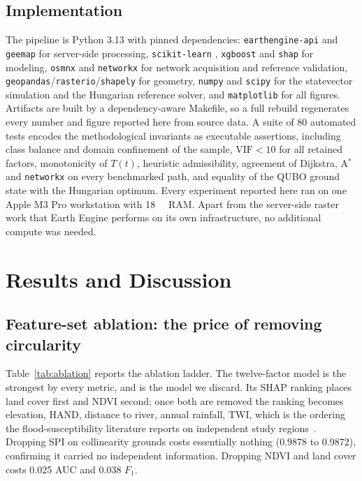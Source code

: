 \documentclass[10pt,twocolumn]{article}
\newcommand{\Tt}{T(t)}
\begin{document}
\subsection{Implementation}
The pipeline is Python 3.13 with pinned dependencies: \texttt{earthengine-api}
and \texttt{geemap} for server-side processing, \texttt{scikit-learn}
\citep{pedregosa2011}, \texttt{xgboost} \citep{chen2016} and \texttt{shap}
\citep{lundberg2017} for modeling, \texttt{osmnx} \citep{boeing2017} and
\texttt{networkx} for network acquisition and reference validation,
\texttt{geopandas}/\texttt{rasterio}/\texttt{shapely} for geometry,
\texttt{numpy} \citep{harris2020} and \texttt{scipy} \citep{virtanen2020} for the
statevector simulation and the Hungarian reference solver, and
\texttt{matplotlib} \citep{hunter2007} for all figures. Artifacts are built
by a dependency-aware Makefile, so a full rebuild regenerates every number and
figure reported here from source data. A suite of 80 automated tests encodes the
methodological invariants as executable assertions, including class balance and
domain confinement of the sample, $\mathrm{VIF}<10$ for all retained factors,
monotonicity of $\Tt$, heuristic admissibility, agreement of Dijkstra, A$^\ast$
and \texttt{networkx} on every benchmarked path, and equality of the QUBO ground
state with the Hungarian optimum. Every experiment reported here ran on one Apple
M3 Pro workstation with \SI{18}{\giga\byte} RAM. Apart from the server-side
raster work that Earth Engine performs on its own infrastructure, no additional
compute was needed.

\section{Results and Discussion}
\label{sec:results}

\subsection{Feature-set ablation: the price of removing circularity}
\label{sec:res-ablation}

Table~\ref{tab:ablation} reports the ablation ladder. The twelve-factor model is
the strongest by every metric, and is the model we discard. Its SHAP ranking
places land cover first and NDVI second; once both are removed the ranking
becomes elevation, HAND, distance to river, annual rainfall, TWI, which is the
ordering the flood-susceptibility literature reports on independent study
regions~\citep{arabameri2019,saha2021,aydin2022}. Dropping SPI on collinearity
grounds costs essentially nothing (0.9878 to 0.9872), confirming it carried no
independent information. Dropping NDVI and land cover costs 0.025 AUC and 0.038
$F_1$.
\end{document}
